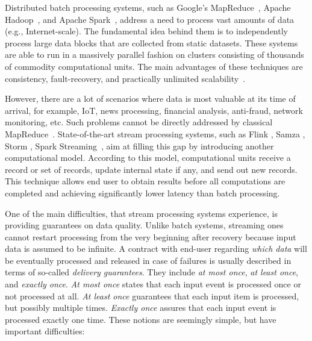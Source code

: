 
\label {fs-intro-seciton}

Distributed batch processing systems, such as Google's MapReduce~\cite{Dean:2008:MSD:1327452.1327492}, Apache Hadoop~\cite{hadoop2009hadoop}, and Apache Spark~\cite{Zaharia:2016:ASU:3013530.2934664}, address a need to process vast amounts of data (e.g., Internet-scale). The fundamental idea behind them is to independently process large data blocks that are collected from static datasets. These systems are able to run in a massively parallel fashion on clusters consisting of thousands of commodity computational units. The main advantages of these techniques are consistency, fault-recovery, and practically unlimited scalability~\cite{borthakur2011apache}.

However, there are a lot of scenarios where data is most valuable at its time of arrival, for example, IoT, news processing, financial analysis, anti-fraud, network monitoring, etc. Such problems cannot be directly addressed by classical MapReduce~\cite{Doulkeridis:2014:SLA:2628707.2628782}. State-of-the-art stream processing systems, such as Flink \cite{carbone2015apache}, Samza \cite{Noghabi:2017:SSS:3137765.3137770}, Storm \cite{apache:storm}, Spark Streaming~\cite{Zaharia:2012:DSE:2342763.2342773}, aim at filling this gap by introducing another computational model. According to this model, computational units receive a record or set of records, update internal state if any, and send out new records. This technique allows end user to obtain results before all computations are completed and achieving significantly lower latency than batch processing. 

One of the main difficulties, that stream processing systems experience, is providing guarantees on data quality. 
Unlike batch systems, streaming ones cannot restart processing from the very beginning after recovery because input data is assumed to be infinite. A contract with end-user regarding {\em which data} will be eventually processed and released in case of failures is usually described in terms of so-called {\em delivery guarantees}. They include {\em at most once}, {\em at least once}, and {\em exactly once}. {\it At most once} states that each input event is processed once or not processed at all. {\it At least once} guarantees that each input item is processed, but possibly multiple times. {\it Exactly once} assures that each input event is processed exactly one time. These notions are seemingly simple, but have important difficulties:

